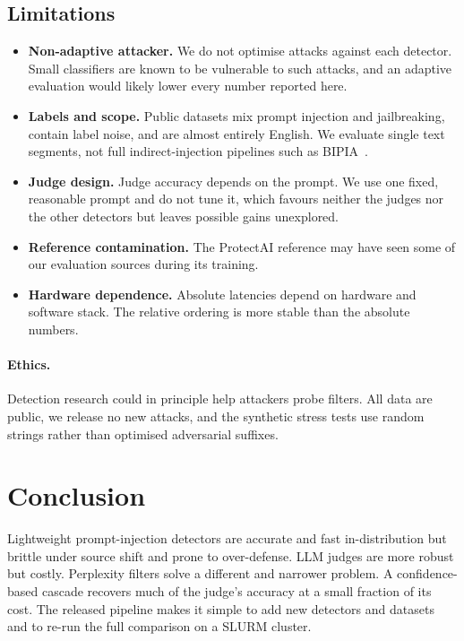 \documentclass[11pt]{article}
\newif\ifdraft
\newcommand{\claim}[1]{\ifdraft{\color{blue!65!black}#1}\else#1\fi}
\begin{document}
\subsection{Limitations}
\label{sec:limits}
\begin{itemize}
  \item \textbf{Non-adaptive attacker.} We do not optimise attacks against each detector.
        Small classifiers are known to be vulnerable to such attacks, and an adaptive
        evaluation would likely lower every number reported here.
  \item \textbf{Labels and scope.} Public datasets mix prompt injection and jailbreaking,
        contain label noise, and are almost entirely English. We evaluate single text
        segments, not full indirect-injection pipelines such as BIPIA~\citep{yi2023benchmarking}.
  \item \textbf{Judge design.} Judge accuracy depends on the prompt. We use one fixed,
        reasonable prompt and do not tune it, which favours neither the judges nor the
        other detectors but leaves possible gains unexplored.
  \item \textbf{Reference contamination.} The ProtectAI reference may have seen some of our
        evaluation sources during its training.
  \item \textbf{Hardware dependence.} Absolute latencies depend on hardware and software
        stack. The relative ordering is more stable than the absolute numbers.
\end{itemize}

\paragraph{Ethics.}
Detection research could in principle help attackers probe filters. All data are public,
we release no new attacks, and the synthetic stress tests use random strings rather
than optimised adversarial suffixes.

\section{Conclusion}
\claim{Lightweight prompt-injection detectors are accurate and fast in-distribution but
brittle under source shift and prone to over-defense. LLM judges are more robust but
costly. Perplexity filters solve a different and narrower problem.} A
confidence-based cascade recovers much of the judge's accuracy at a small fraction of its
cost. The released pipeline makes it simple to add new detectors and datasets and to
re-run the full comparison on a SLURM cluster.
\end{document}
